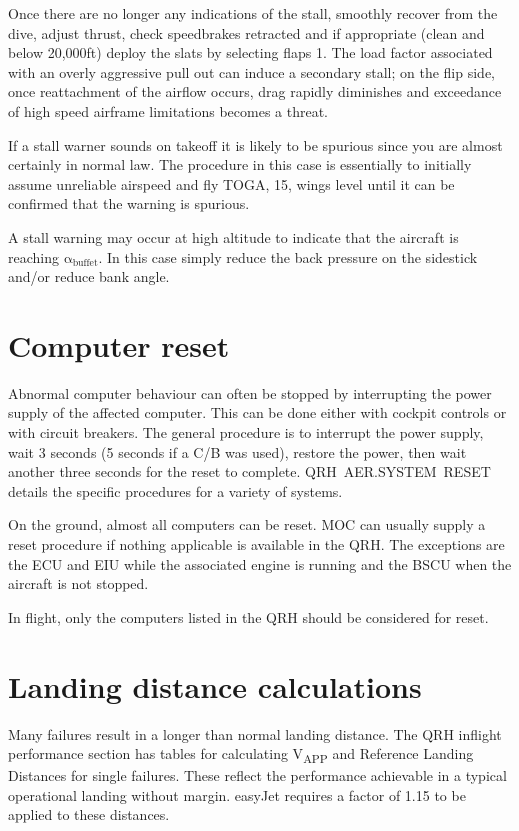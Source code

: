 \documentclass[a5paper,11pt,twoside]{book}
\newcommand{\inlcite}[1]{{\footnotesize\scshape\MakeLowercase{[#1]}}}
\newcommand{\multicite}[1]{%

  \nopagebreak
  \noindent{{\color{blue}\inlcite{#1}}}
}
\newcommand{\V}[1]{V\textsubscript{#1}}
\begin{document}
Once there are no longer any indications of the stall, smoothly recover from the
dive, adjust thrust, check speedbrakes retracted and if appropriate (clean and
below 20,000ft) deploy the slats by selecting flaps 1. The load factor
associated with an overly aggressive pull out can induce a secondary stall; on
the flip side, once reattachment of the airflow occurs, drag rapidly diminishes
and exceedance of high speed airframe limitations becomes a threat.

If a stall warner sounds on takeoff it is likely to be spurious since you are
almost certainly in normal law. The procedure in this case is essentially to
initially assume unreliable airspeed and fly TOGA, 15\textdegree , wings level
until it can be confirmed that the warning is spurious.

A stall warning may occur at high altitude to indicate that the aircraft is
reaching $\mathrm{\alpha_{buffet}}$. In this case simply reduce the back
pressure on the sidestick and/or reduce bank angle.

\multicite{FCOM~PRO.AER.MISC}


\section{Computer reset}

Abnormal computer behaviour can often be stopped by interrupting the power
supply of the affected computer. This can be done either with cockpit controls
or with circuit breakers. The general procedure is to interrupt the power
supply, wait 3 seconds (5 seconds if a C/B was used), restore the power, then
wait another three seconds for the reset to complete. QRH~AER.SYSTEM~RESET
details the specific procedures for a variety of systems.

On the ground, almost all computers can be reset. MOC can usually supply a reset
procedure if nothing applicable is available in the QRH. The exceptions are the
ECU and EIU while the associated engine is running and the BSCU when the
aircraft is not stopped.

In flight, only the computers listed in the QRH should be considered for reset.

\multicite{QRH~AER.SYSTEM~RESET}

\section{Landing distance calculations}

Many failures result in a longer than normal landing distance. The QRH inflight
performance section has tables for calculating \V{APP} and Reference Landing
Distances for single failures. These reflect the performance achievable in a
typical operational landing without margin. easyJet requires a factor of 1.15 to
be applied to these distances.
\end{document}
